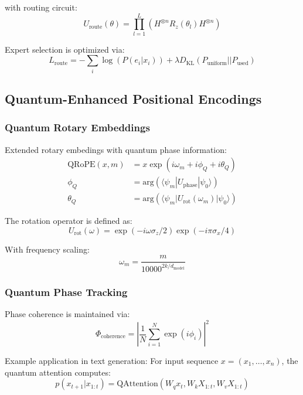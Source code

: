 \documentclass{article}
\begin{document}
with routing circuit:
\begin{equation}
U_{\text{route}}(\theta) = \prod_{l=1}^L \left(H^{\otimes n} R_z(\theta_l) H^{\otimes n}\right)
\end{equation}

Expert selection is optimized via:
\begin{equation}
L_{\text{route}} = -\sum_i \log(P(e_i|x_i)) + \lambda D_{\text{KL}}(P_{\text{uniform}}||P_{\text{used}})
\end{equation}

\subsection{Quantum-Enhanced Positional Encodings}

\subsubsection{Quantum Rotary Embeddings}
Extended rotary embedings with quantum phase information:
\begin{equation}
\begin{split}
\text{QRoPE}(x,m) &= x\exp(i\omega_m + i\phi_Q + i\theta_Q) \\
\phi_Q &= \text{arg}(\langle\psi_m|U_{\text{phase}}|\psi_0\rangle) \\
\theta_Q &= \text{arg}(\langle\psi_m|U_{\text{rot}}(\omega_m)|\psi_0\rangle)
\end{split}
\end{equation}

The rotation operator is defined as:
\begin{equation}
U_{\text{rot}}(\omega) = \exp(-i\omega \sigma_z/2) \exp(-i\pi \sigma_x/4)
\end{equation}

With frequency scaling:
\begin{equation}
\omega_m = \frac{m}{10000^{2k/d_{\text{model}}}}
\end{equation}

\subsubsection{Quantum Phase Tracking}
Phase coherence is maintained via:
\begin{equation}
\Phi_{\text{coherence}} = \left|\frac{1}{N}\sum_{i=1}^N \exp(i\phi_i)\right|^2
\end{equation}

Example application in text generation:
For input sequence $x = (x_1,\ldots,x_n)$, the quantum attention computes:
\begin{equation}
p(x_{t+1}|x_{1:t}) = \text{QAttention}(W_qx_t, W_kX_{1:t}, W_vX_{1:t})
\end{equation}
\end{document}
